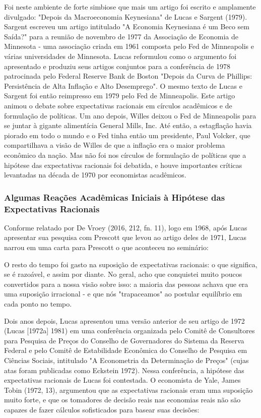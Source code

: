 \documentclass[a4paper,12pt]{article}[abntex2]
\begin{document}
Foi neste ambiente de forte simbiose que mais um artigo foi escrito e amplamente divulgado: "Depois da Macroeconomia Keynesiana" de Lucas e Sargent (1979). Sargent escreveu um artigo intitulado "A Economia Keynesiana é um Beco sem Saída?" para a reunião de novembro de 1977 da Associação de Economia de Minnesota - uma associação criada em 1961 composta pelo Fed de Minneapolis e várias universidades de Minnesota. Lucas reformulou como o argumento foi apresentado e produziu seus artigos conjuntos para a conferência de 1978 patrocinada pelo Federal Reserve Bank de Boston "Depois da Curva de Phillips: Persistência de Alta Inflação e Alto Desemprego". O mesmo texto de Lucas e Sargent foi então reimpresso em 1979 pelo Fed de Minneapolis. Este artigo animou o debate sobre expectativas racionais em círculos acadêmicos e de formulação de políticas. Um ano depois, Willes deixou o Fed de Minneapolis para se juntar à gigante alimentícia General Mills, Inc. Até então, a estagflação havia piorado em todo o mundo e o Fed tinha então um presidente, Paul Volcker, que compartilhava a visão de Willes de que a inflação era o maior problema econômico da nação. Mas não foi nos círculos de formulação de políticas que a hipótese das expectativas racionais foi debatida, e houve importantes críticas levantadas na década de 1970 por economistas acadêmicos.

\subsubsection{\textbf{Algumas Reações Acadêmicas Iniciais à Hipótese das Expectativas Racionais}}

Conforme relatado por De Vroey (2016, 212, fn. 11), logo em 1968, após Lucas apresentar sua pesquisa com Prescott que levou ao artigo deles de 1971, Lucas narrou em uma carta para Prescott o que aconteceu no seminário:

O resto do tempo foi gasto na suposição de expectativas racionais: o que significa, se é razoável, e assim por diante. No geral, acho que conquistei muito poucos convertidos para a nossa visão sobre isso: a maioria das pessoas achava que era uma suposição irracional - e que nós "trapaceamos" ao postular equilíbrio em cada ponto no tempo.

Dois anos depois, Lucas apresentou uma versão anterior de seu artigo de 1972 (Lucas [1972a] 1981) em uma conferência organizada pelo Comitê de Consultores para Pesquisa de Preços do Conselho de Governadores do Sistema da Reserva Federal e pelo Comitê de Estabilidade Econômica do Conselho de Pesquisa em Ciências Sociais, intitulado "A Econometria da Determinação de Preços" (cujas atas foram publicadas como Eckstein 1972). Nessa conferência, a hipótese das expectativas racionais de Lucas foi contestada. O economista de Yale, James Tobin (1972, 13), argumentou que as expectativas racionais eram uma suposição muito forte, e que os tomadores de decisão reais nas economias reais não são capazes de fazer cálculos sofisticados para basear suas decisões:
\end{document}
